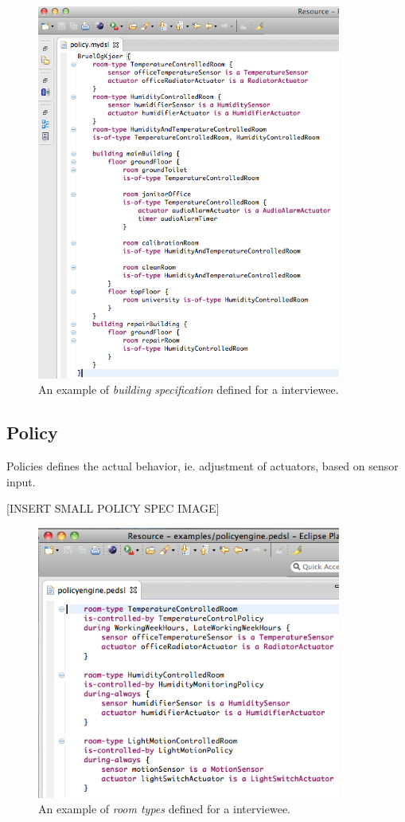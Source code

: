 \documentclass{llncs}
\begin{document}
\begin{figure}
  \begin{center}
    \includegraphics[width=10cm]{dsl-building-spec.png}
  \end{center}  
\caption{An example of \textit{building specification} defined for a interviewee.}
\label{fig:dsl-building-spec}
\end{figure}

\subsection{Policy}\label{subsec:rooms}
Policies defines the actual behavior, ie. adjustment of actuators, based on sensor input. 

[INSERT SMALL POLICY SPEC IMAGE]

\begin{figure}
  \begin{center}
    \includegraphics[width=10cm]{dsl-room-types.png}
  \end{center}  
\caption{An example of \textit{room types} defined for a interviewee.}
\label{fig:roomtypes}
\end{figure}
\end{document}
